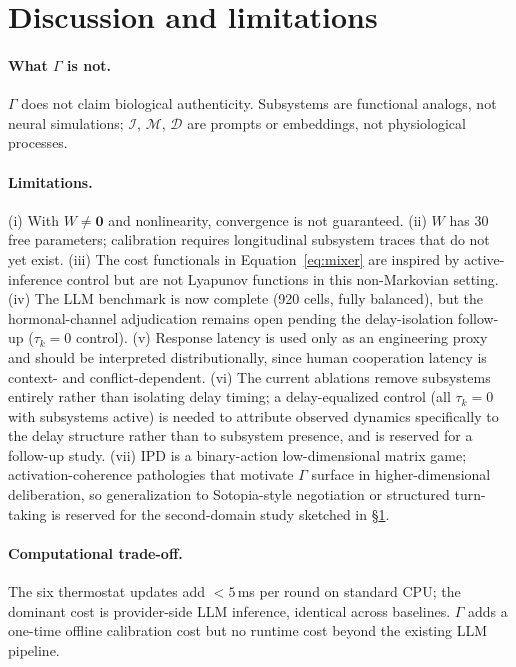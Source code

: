 \documentclass{article}
\begin{document}
\section{Discussion and limitations}\label{sec:limits}

\paragraph{What $\Gamma$ is not.} $\Gamma$ does not claim biological authenticity. Subsystems are functional analogs, not neural simulations; $\mathcal{I}$, $\mathcal{M}$, $\mathcal{D}$ are prompts or embeddings, not physiological processes.

\paragraph{Limitations.} (i) With $W \neq \mathbf{0}$ and nonlinearity, convergence is not guaranteed. (ii) $W$ has 30 free parameters; calibration requires longitudinal subsystem traces that do not yet exist. (iii) The cost functionals in Equation~\eqref{eq:mixer} are inspired by active-inference control but are not Lyapunov functions in this non-Markovian setting. (iv) The LLM benchmark is now complete (920 cells, fully balanced), but the hormonal-channel adjudication remains open pending the delay-isolation follow-up ($\tau_k=0$ control). (v) Response latency is used only as an engineering proxy and should be interpreted distributionally, since human cooperation latency is context- and conflict-dependent. (vi) The current ablations remove subsystems entirely rather than isolating delay timing; a delay-equalized control (all $\tau_k = 0$ with subsystems active) is needed to attribute observed dynamics specifically to the delay structure rather than to subsystem presence, and is reserved for a follow-up study. (vii) IPD is a binary-action low-dimensional matrix game; activation-coherence pathologies that motivate $\Gamma$ surface in higher-dimensional deliberation, so generalization to Sotopia-style negotiation or structured turn-taking is reserved for the second-domain study sketched in \S\ref{sec:limits}.

\paragraph{Computational trade-off.} The six thermostat updates add $<5$\,ms per round on standard CPU; the dominant cost is provider-side LLM inference, identical across baselines. $\Gamma$ adds a one-time offline calibration cost but no runtime cost beyond the existing LLM pipeline.
\end{document}
